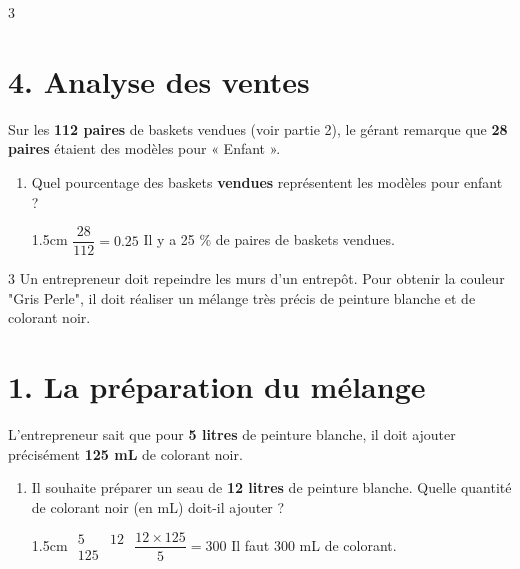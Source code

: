 \documentclass[a4paper]{book}
\begin{document}
{\begin{exerciceNote}{3}
        \section*{4. Analyse des ventes}
        Sur les \textbf{112 paires} de baskets vendues (voir partie 2), le gérant remarque que \textbf{28 paires} étaient des modèles pour « Enfant ».
        
        \begin{enumerate}[resume, leftmargin=*]
            \item Quel pourcentage des baskets \textbf{vendues} représentent les modèles pour enfant ?
            
            \begin{ZoneReponse}{1.5cm}    
                $\dfrac{28}{112}=0.25$
                \quad Il y a 25 \% de paires de baskets vendues.
            \end{ZoneReponse}
        \end{enumerate}  
    \end{exerciceNote}


    \begin{exerciceNote}{3}
        Un entrepreneur doit repeindre les murs d'un entrepôt. Pour obtenir la couleur "Gris Perle", il doit réaliser un mélange très précis de peinture blanche et de colorant noir.

        \section*{1. La préparation du mélange}
        L'entrepreneur sait que pour \textbf{5 litres} de peinture blanche, il doit ajouter précisément \textbf{125 mL} de colorant noir.
        
        
        \begin{enumerate}[leftmargin=*]
            \item Il souhaite préparer un seau de \textbf{12 litres} de peinture blanche. Quelle quantité de colorant noir (en mL) doit-il ajouter ?

                        
            \begin{ZoneReponse}{1.5cm}     
                $\begin{array}{c|c}
                     5 & 12 \\ \hline
                     125 & 
                \end{array}$ 
                \quad $\dfrac{12\times125}{5}=300$
                \quad Il faut 300 mL de colorant.
            \end{ZoneReponse}
            

\end{enumerate}
\end{exerciceNote}}
\end{document}
